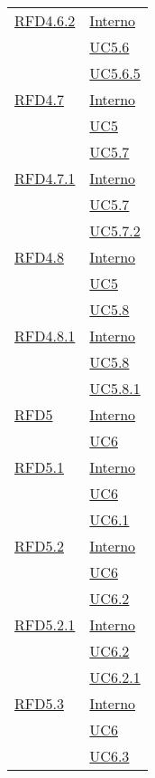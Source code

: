 \begin{longtable}{|>{\centering}m{5cm}|m{5cm}<{\centering}|}
\hyperlink{RFD4.6.2}{RFD4.6.2} & \hyperlink{Interno}{Interno}\\
& \hyperref[UC5.6]{UC5.6}\\
& \hyperref[UC5.6.5]{UC5.6.5}\\ \hline

\hyperlink{RFD4.7}{RFD4.7} & \hyperlink{Interno}{Interno}\\
& \hyperref[UC5]{UC5}\\
& \hyperref[UC5.7]{UC5.7}\\ \hline

\hyperlink{RFD4.7.1}{RFD4.7.1} & \hyperlink{Interno}{Interno}\\
& \hyperref[UC5.7]{UC5.7}\\
& \hyperref[UC5.7.2]{UC5.7.2}\\ \hline

\hyperlink{RFD4.8}{RFD4.8} & \hyperlink{Interno}{Interno}\\
& \hyperref[UC5]{UC5}\\
& \hyperref[UC5.8]{UC5.8}\\ \hline

\hyperlink{RFD4.8.1}{RFD4.8.1} & \hyperlink{Interno}{Interno}\\
& \hyperref[UC5.8]{UC5.8}\\
& \hyperref[UC5.8.1]{UC5.8.1}\\ \hline

\hyperlink{RFD5}{RFD5} & \hyperlink{Interno}{Interno}\\
& \hyperref[UC6]{UC6}\\ \hline

\hyperlink{RFD5.1}{RFD5.1} & \hyperlink{Interno}{Interno}\\
& \hyperref[UC6]{UC6}\\
& \hyperref[UC6.1]{UC6.1}\\ \hline

\hyperlink{RFD5.2}{RFD5.2} & \hyperlink{Interno}{Interno}\\
& \hyperref[UC6]{UC6}\\
& \hyperref[UC6.2]{UC6.2}\\ \hline

\hyperlink{RFD5.2.1}{RFD5.2.1} & \hyperlink{Interno}{Interno}\\
& \hyperref[UC6.2]{UC6.2}\\
& \hyperref[UC6.2.1]{UC6.2.1}\\ \hline

\hyperlink{RFD5.3}{RFD5.3} & \hyperlink{Interno}{Interno}\\
& \hyperref[UC6]{UC6}\\
& \hyperref[UC6.3]{UC6.3}\\ \hline


\end{longtable}
